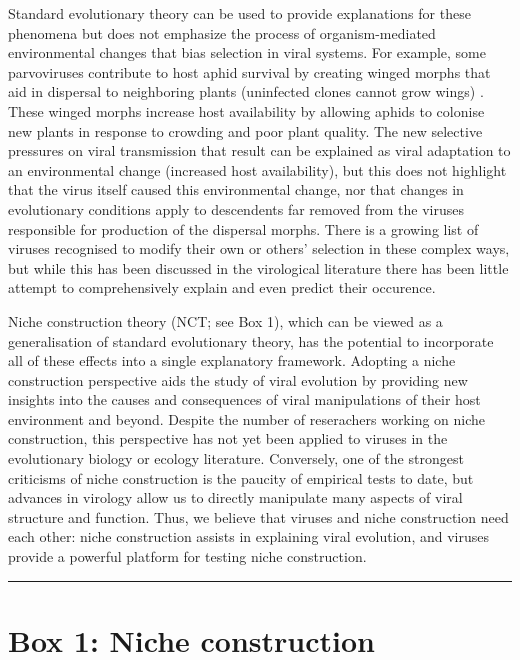 \documentclass[review,draft,12pt]{elsarticle}
\begin{document}
Standard evolutionary theory can be used to provide explanations for
these phenomena but does not emphasize the process of organism-mediated
environmental changes that bias selection in viral systems. For example,
some parvoviruses contribute to host aphid survival by creating winged
morphs that aid in dispersal to neighboring plants (uninfected clones
cannot grow wings) \citep{Ryabov2009}. These winged morphs increase host
availability by allowing aphids to colonise new plants in response to
crowding and poor plant quality. The new selective pressures on viral
transmission that result can be explained as viral adaptation to an
environmental change (increased host availability), but this does not
highlight that the virus itself caused this environmental change, nor
that changes in evolutionary conditions apply to descendents far removed
from the viruses responsible for production of the dispersal morphs.
There is a growing list of viruses recognised to modify their own or
others' selection in these complex ways, but while this has been
discussed in the virological literature there has been little attempt to
comprehensively explain and even predict their occurence.

Niche construction theory (NCT; see Box 1), which can be viewed as a
generalisation of standard evolutionary theory, has the potential to
incorporate all of these effects into a single explanatory framework.
Adopting a niche construction perspective aids the study of viral
evolution by providing new insights into the causes and consequences of
viral manipulations of their host environment and beyond. Despite the
number of reserachers working on niche construction, this perspective
has not yet been applied to viruses in the evolutionary biology or
ecology literature. Conversely, one of the strongest criticisms of niche
construction is the paucity of empirical tests to date, but advances in
virology allow us to directly manipulate many aspects of viral structure
and function. Thus, we believe that viruses and niche construction need
each other: niche construction assists in explaining viral evolution,
and viruses provide a powerful platform for testing niche construction.

\begin{center}\rule{3in}{0.4pt}\end{center}

\section{Box 1: Niche construction}\label{box-1-niche-construction}
\end{document}
